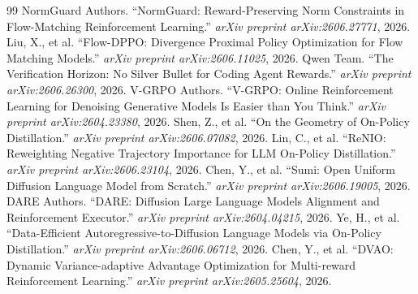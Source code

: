 \documentclass[11pt,a4paper]{article}
\begin{document}
\begin{thebibliography}{99}
 NormGuard Authors. ``NormGuard: Reward-Preserving Norm Constraints in Flow-Matching Reinforcement Learning.'' \emph{arXiv preprint arXiv:2606.27771}, 2026.
 Liu, X., et al. ``Flow-DPPO: Divergence Proximal Policy Optimization for Flow Matching Models.'' \emph{arXiv preprint arXiv:2606.11025}, 2026.
 Qwen Team. ``The Verification Horizon: No Silver Bullet for Coding Agent Rewards.'' \emph{arXiv preprint arXiv:2606.26300}, 2026.
 V-GRPO Authors. ``V-GRPO: Online Reinforcement Learning for Denoising Generative Models Is Easier than You Think.'' \emph{arXiv preprint arXiv:2604.23380}, 2026.
 Shen, Z., et al. ``On the Geometry of On-Policy Distillation.'' \emph{arXiv preprint arXiv:2606.07082}, 2026.
 Lin, C., et al. ``ReNIO: Reweighting Negative Trajectory Importance for LLM On-Policy Distillation.'' \emph{arXiv preprint arXiv:2606.23104}, 2026.
 Chen, Y., et al. ``Sumi: Open Uniform Diffusion Language Model from Scratch.'' \emph{arXiv preprint arXiv:2606.19005}, 2026.
 DARE Authors. ``DARE: Diffusion Large Language Models Alignment and Reinforcement Executor.'' \emph{arXiv preprint arXiv:2604.04215}, 2026.
 Ye, H., et al. ``Data-Efficient Autoregressive-to-Diffusion Language Models via On-Policy Distillation.'' \emph{arXiv preprint arXiv:2606.06712}, 2026.
 Chen, Y., et al. ``DVAO: Dynamic Variance-adaptive Advantage Optimization for Multi-reward Reinforcement Learning.'' \emph{arXiv preprint arXiv:2605.25604}, 2026.
\end{thebibliography}
\end{document}
